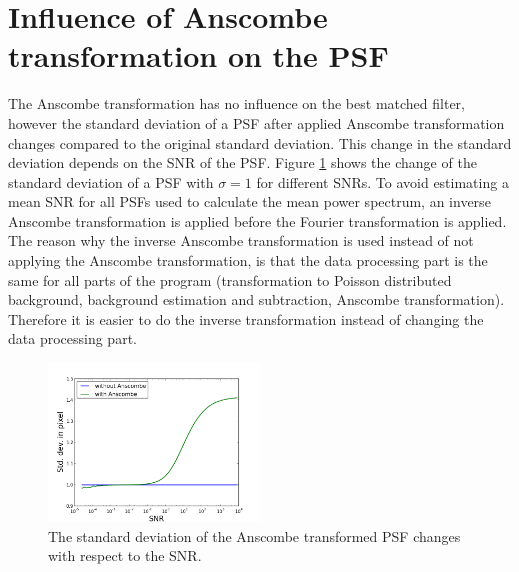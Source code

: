 \section{Influence of Anscombe transformation on the PSF}\label{PSF}
The Anscombe transformation has no influence on the best matched filter, however the standard deviation of a PSF after applied Anscombe transformation changes compared to the original standard deviation. This change in the standard deviation depends on the SNR of the PSF. Figure \ref{psfwider} shows the change of the standard deviation of a PSF with $\sigma=1$ for different SNRs. To avoid estimating a mean SNR for all PSFs used to calculate the mean power spectrum, an inverse Anscombe transformation is applied before the Fourier transformation is applied.\newline
The reason why the inverse Anscombe transformation is used instead of not applying the Anscombe transformation, is that the data processing part is the same for all parts of the program (transformation to Poisson distributed background, background estimation and subtraction, Anscombe transformation). Therefore it is easier to do the inverse transformation instead of changing the data processing part.

\begin{figure}
\includegraphics[width = 0.5\textwidth]{pictures/AnscombeChangesWidth.png}
\caption{The standard deviation of the Anscombe transformed PSF changes with respect to the SNR.}
\label{psfwider}
\end{figure}

